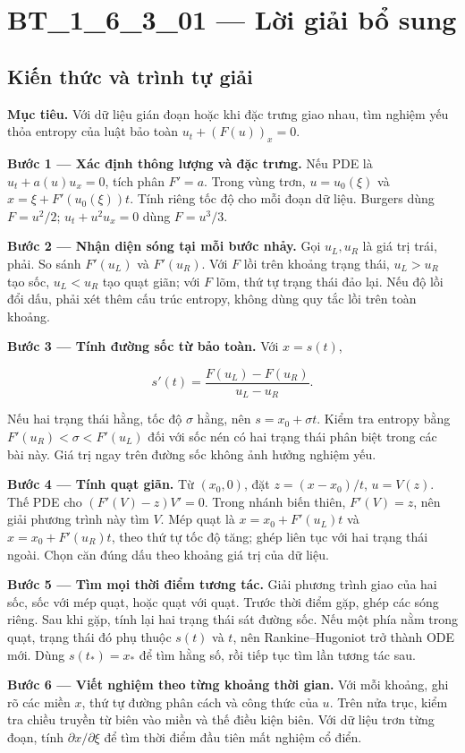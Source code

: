 \documentclass[10pt,a4paper]{article}
\begin{document}
\section*{BT\_1\_6\_3\_01 — Lời giải bổ sung}
\subsection*{Kiến thức và trình tự giải}
\textbf{Mục tiêu.} Với dữ liệu gián đoạn hoặc khi đặc trưng giao nhau, tìm nghiệm yếu thỏa entropy của luật bảo toàn $u_t+(F(u))_x=0$.

\textbf{Bước 1 — Xác định thông lượng và đặc trưng.} Nếu PDE là $u_t+a(u)u_x=0$, tích phân $F'=a$. Trong vùng trơn, $u=u_0(\xi)$ và $x=\xi+F'(u_0(\xi))t$. Tính riêng tốc độ cho mỗi đoạn dữ liệu. Burgers dùng $F=u^2/2$; $u_t+u^2u_x=0$ dùng $F=u^3/3$.

\textbf{Bước 2 — Nhận diện sóng tại mỗi bước nhảy.} Gọi $u_L,u_R$ là giá trị trái, phải. So sánh $F'(u_L)$ và $F'(u_R)$. Với $F$ lồi trên khoảng trạng thái, $u_L>u_R$ tạo sốc, $u_L<u_R$ tạo quạt giãn; với $F$ lõm, thứ tự trạng thái đảo lại. Nếu độ lồi đổi dấu, phải xét thêm cấu trúc entropy, không dùng quy tắc lồi trên toàn khoảng.

\textbf{Bước 3 — Tính đường sốc từ bảo toàn.} Với $x=s(t)$,

\[
s'(t)=\frac{F(u_L)-F(u_R)}{u_L-u_R}.
\]

Nếu hai trạng thái hằng, tốc độ $\sigma$ hằng, nên $s=x_0+\sigma t$. Kiểm tra entropy bằng $F'(u_R)<\sigma<F'(u_L)$ đối với sốc nén có hai trạng thái phân biệt trong các bài này. Giá trị ngay trên đường sốc không ảnh hưởng nghiệm yếu.

\textbf{Bước 4 — Tính quạt giãn.} Từ $(x_0,0)$, đặt $z=(x-x_0)/t$, $u=V(z)$. Thế PDE cho $(F'(V)-z)V'=0$. Trong nhánh biến thiên, $F'(V)=z$, nên giải phương trình này tìm $V$. Mép quạt là $x=x_0+F'(u_L)t$ và $x=x_0+F'(u_R)t$, theo thứ tự tốc độ tăng; ghép liên tục với hai trạng thái ngoài. Chọn căn đúng dấu theo khoảng giá trị của dữ liệu.

\textbf{Bước 5 — Tìm mọi thời điểm tương tác.} Giải phương trình giao của hai sốc, sốc với mép quạt, hoặc quạt với quạt. Trước thời điểm gặp, ghép các sóng riêng. Sau khi gặp, tính lại hai trạng thái sát đường sốc. Nếu một phía nằm trong quạt, trạng thái đó phụ thuộc $s(t)$ và $t$, nên Rankine–Hugoniot trở thành ODE mới. Dùng $s(t_*)=x_*$ để tìm hằng số, rồi tiếp tục tìm lần tương tác sau.

\textbf{Bước 6 — Viết nghiệm theo từng khoảng thời gian.} Với mỗi khoảng, ghi rõ các miền $x$, thứ tự đường phân cách và công thức của $u$. Trên nửa trục, kiểm tra chiều truyền từ biên vào miền và thế điều kiện biên. Với dữ liệu trơn từng đoạn, tính $\partial x/\partial\xi$ để tìm thời điểm đầu tiên mất nghiệm cổ điển.
\end{document}

